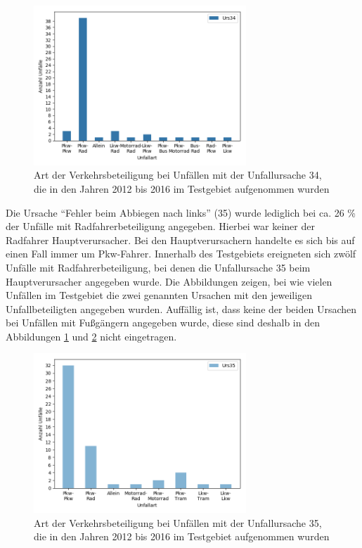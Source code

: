 \begin{savenotes}
	\begin{figure}[H]
		\centering
		\includegraphics[width=8cm,height=6cm]{figures/Urs34_Beteiligung}
		\caption[Art der Verkehrsbeteiligung bei Unfällen mit der Unfallursache 34, die in den Jahren 2012 bis 2016 im Testgebiet aufgenommen wurden]{Art der Verkehrsbeteiligung bei Unfällen mit der Unfallursache 34, die in den Jahren 2012 bis 2016 im Testgebiet aufgenommen wurden}\label{fig:Urs34_Verkehrsbeteiligung}
	\end{figure}
\end{savenotes}

Die Ursache \enquote{Fehler beim Abbiegen nach links} (35) wurde lediglich bei ca. 26 \% der Unfälle mit Radfahrerbeteiligung angegeben. Hierbei war keiner der Radfahrer Hauptverursacher. Bei den Hauptverursachern handelte es sich bis auf einen Fall immer um Pkw-Fahrer. Innerhalb des Testgebiets ereigneten sich zwölf Unfälle mit Radfahrerbeteiligung, bei denen die Unfallursache 35 beim Hauptverursacher angegeben wurde. Die Abbildungen  zeigen, bei wie vielen Unfällen im Testgebiet die zwei genannten Ursachen mit den jeweiligen Unfallbeteiligten angegeben wurden. Auffällig ist, dass keine der beiden Ursachen bei Unfällen mit Fußgängern angegeben wurde, diese sind deshalb in den Abbildungen \ref{fig:Urs34_Verkehrsbeteiligung} und \ref{fig:Urs35_Verkehrsbeteiligung} nicht eingetragen.

\begin{savenotes}
	\begin{figure}[H]
		\centering
		\includegraphics[width=8cm,height=6cm]{figures/Urs35_Beteiligung}
		\caption[Art der Verkehrsbeteiligung bei Unfällen mit der Unfallursache 35, die in den Jahren 2012 bis 2016 im Testgebiet aufgenommen wurden]{Art der Verkehrsbeteiligung bei Unfällen mit der Unfallursache 35, die in den Jahren 2012 bis 2016 im Testgebiet aufgenommen wurden}\label{fig:Urs35_Verkehrsbeteiligung}
	\end{figure}
\end{savenotes}

